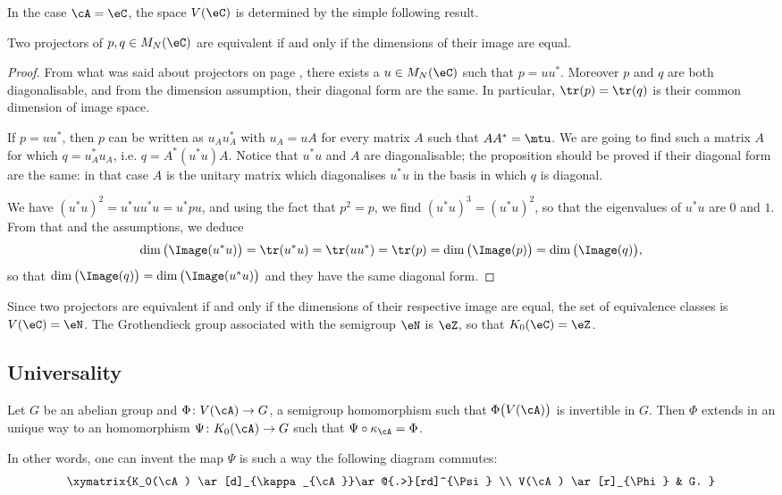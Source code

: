 In the case $\cA=\eC$, the space $V(\eC)$ is determined by the simple following result.
\begin{proposition}
Two projectors of $p,q\in M_N(\eC)$ are equivalent if and only if the dimensions of their image are equal.
\end{proposition}

\begin{proof}
From what was said about projectors on page \pageref{PgProjPositif} , there exists a $u\in M_N(\eC)$ such that $p=uu^*$. Moreover $p$ and $q$ are both diagonalisable, and from the dimension assumption, their diagonal form are the same. In particular, $\tr(p)=\tr(q)$ is their common dimension of image space. 

If $p=uu^*$, then $p$ can be written as $u_Au_A^*$ with $u_A=uA$ for every matrix $A$ such that $AA^*=\mtu$. We are going to find such a matrix $A$ for which $q=u_A^*u_A$, i.e. $q=A^*(u^*u)A$. Notice that $u^*u$ and $A$ are diagonalisable; the proposition should be proved if their diagonal form are the same: in that case $A$ is the unitary matrix which diagonalises $u^*u$ in the basis in which $q$ is diagonal.

We have $(u^*u)^2=u^*uu^*u=u^*pu$, and using the fact that $p^2=p$, we find $(u^*u)^3=(u^*u)^2$, so that the eigenvalues of $u^*u$ are $0$ and $1$. From that and the assumptions, we deduce
\[ 
  \dim\big( \Image(u^*u) \big)=\tr(u^*u)=\tr(uu^*)=\tr(p)=\dim\big( \Image(p) \big)=\dim\big( \Image(q) \big),
\]
so that $\dim\big( \Image(q) \big)=\dim\big( \Image(u^*u)\big)$ and they have the same diagonal form.
\end{proof}

Since two projectors are equivalent if and only if the dimensions of their respective image are equal, the set of equivalence classes is $V(\eC)=\eN$. The Grothendieck group associated with the semigroup $\eN$ is $\eZ$, so that $K_0(\eC)=\eZ$.

\subsection{Universality}

\begin{proposition}
Let $G$ be an abelian group and $\Phi\colon V(\cA)\to G$, a semigroup homomorphism such that $\Phi\big( V(\cA) \big)$ is invertible in $G$. Then $\Phi$ extends in an unique way to an homomorphism $\Psi\colon K_0(\cA)\to G$ such that $\Psi\circ\kappa_{\cA}=\Phi$.
\end{proposition}
In other words, one can invent the map $\Psi$ is such a way the following diagram commutes:
\[ 
\xymatrix{%
   K_0(\cA) \ar[d]_{\kappa_{\cA}}\ar@{.>}[rd]^{\Psi}		\\
   V(\cA) \ar[r]_{\Phi}	&	G.
}
\]

